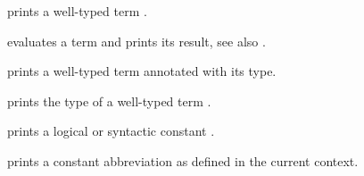 \begin{isabellebody}
\begin{isamarkuptext}
\begin{description}
  \item {} prints a well-typed term .
  
  \item {} evaluates a term  and prints
  its result, see also \hyperlink{command.HOL.value}{\mbox{}}.

  \item {} prints a well-typed term 
  annotated with its type.

  \item {} prints the type of a well-typed term
  .

  \item {} prints a logical or syntactic constant
  .
  
  \item {} prints a constant abbreviation
   as defined in the current context.


\end{description}
\end{isamarkuptext}
\end{isabellebody}
